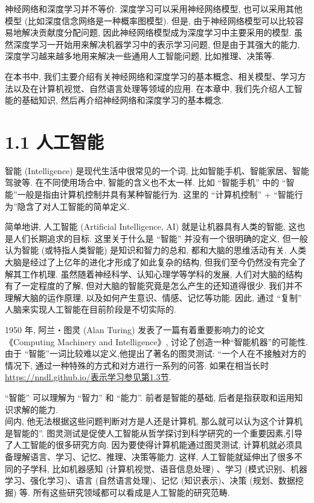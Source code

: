 \documentclass[10pt]{article}
\begin{document}
神经网络和深度学习并不等价. 深度学习可以采用神经网络模型, 也可以采用其他模型 (比如深度信念网络是一种概率图模型). 但是, 由于神经网络模型可以比较容易地解决贡献度分配问题, 因此神经网络模型成为深度学习中主要采用的模型. 虽然深度学习一开始用来解决机器学习中的表示学习问题, 但是由于其强大的能力, 深度学习越来越多地用来解决一些通用人工智能问题, 比如推理、决策等.

在本书中, 我们主要介绍有关神经网络和深度学习的基本概念、相关模型、学习方法以及在计算机视觉、自然语言处理等领域的应用. 在本章中, 我们先介绍人工智能的基础知识, 然后再介绍神经网络和深度学习的基本概念.

\section*{1.1 人工智能}
智能 (Intelligence) 是现代生活中很常见的一个词, 比如智能手机、智能家居、智能驾驶等. 在不同使用场合中, 智能的含义也不太一样. 比如 “智能手机” 中的 “智能”一般是指由计算机控制并具有某种智能行为. 这里的 “计算机控制” + “智能行为”隐含了对人工智能的简单定义.

简单地讲, 人工智能 (Artificial Intelligence, AI) 就是让机器具有人类的智能, 这也是人们长期追求的目标. 这里关于什么是 “智能” 并没有一个很明确的定义, 但一般认为智能 (或特指人类智能) 是知识和智力的总和, 都和大脑的思维活动有关. 人类大脑是经过了上亿年的进化才形成了如此复杂的结构, 但我们至今仍然没有完全了解其工作机理. 虽然随着神经科学、认知心理学等学科的发展, 人们对大脑的结构有了一定程度的了解, 但对大脑的智能究竟是怎么产生的还知道得很少. 我们并不理解大脑的运作原理, 以及如何产生意识、情感、记忆等功能. 因此, 通过 “复制” 人脑来实现人工智能在目前阶段是不切实际的.

1950 年, 阿兰・图灵 (Alan Turing) 发表了一篇有着重要影响力的论文《Computing Machinery and Intelligence》, 讨论了创造一种“智能机器”的可能性. 由于 “智能”一词比较难以定义,他提出了著名的图灵测试: “一个人在不接触对方的情况下, 通过一种特殊的方式和对方进行一系列的问答. 如果在相当长时 \href{https://nndl.github.io/%E8%A1%A8%E7%A4%BA%E5%AD%A6%E4%B9%A0%E5%8F%82%E8%A7%81%E7%AC%AC1.3%E8%8A%82}{https://nndl.github.io/表示学习参见第1.3节}.

“智能” 可以理解为 “智力” 和 “能力”. 前者是智能的基础, 后者是指获取和运用知识求解的能力.\\
间内, 他无法根据这些问题判断对方是人还是计算机, 那么就可以认为这个计算机是智能的”. 图灵测试是促使人工智能从哲学探讨到科学研究的一个重要因素,引导了人工智能的很多研究方向. 因为要使得计算机能通过图灵测试, 计算机就必须具备理解语言、学习、记忆、推理、决策等能力. 这样, 人工智能就延伸出了很多不同的子学科, 比如机器感知 (计算机视觉、语音信息处理) 、学习 (模式识别、机器学习、强化学习)、语言 (自然语言处理)、记忆 (知识表示)、决策 (规划、数据挖掘) 等. 所有这些研究领域都可以看成是人工智能的研究范畴.
\end{document}
